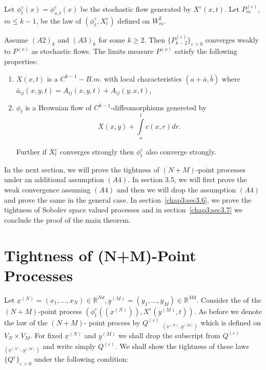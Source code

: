   Let $\phi^\varepsilon_t(x)= \phi^\varepsilon_{o,t}(x)$ be the
  stochastic flow generated by $X^\varepsilon(x,t)$. Let
  $P^{(\varepsilon)}_m$, $m \le k-1$, be the law of
  $(\phi^\varepsilon_t,  X^\varepsilon_t)$ defined on $W^2_m$. 
  

\begin{theorem}\label{c3:thm3.3.1}%
  Assume $(A2)_k$ and $(A3)_k$ for some $k \ge 2$. Then
  $\{P^{(\varepsilon)}_{k-2}\}_{\varepsilon > 0}$ converges weakly
  to $P^{(o)}$ as stochastic flows. The limits measure $P^{(o)}$ satisfy
  the following properties: 
  \begin{enumerate}[\rm (a)]
  \item $X (x,t)$ is a $C^{k-1}-B.m$. with local characteristics
    $(a+\bar{a}, \bar{b})$ where $\bar{a}_{ij}(x,y,t)= A_{ij}(x,y,t)
    + A_{ij}(y,x,t)$, 

  \item\pageoriginale $\phi_t$ is a Brownian flow of $C^{k-1}$-diffeomorphisms
    genereted by 
    $$X(x,y) + \int\limits_{o}^t c(x,r) dr.$$  
    
    Further if $X^\varepsilon _t$ converges strongly then
    $\phi^\varepsilon_t$ also converge strongly. 
  \end{enumerate}
\end{theorem}  

  In the next section, we will prove the tightness of $(N+M)$-point
  processes under an additional assumption $(A4)$. In section  3.5,
  we will first  prove the weak convergence assuming $(A4)$ and then
  we will drop the assumption  $(A4)$ and prove the same in the general
  case. In section~\ref{chap3:sec3.6},  we prove the tightness of Sobolev space
  valued processes and in section~\ref{chap3:sec3.7} we conclude the proof of the
  main theorem. 
  
\section{Tightness of (N+M)-Point Processes}\label{chap3:sec3.4}%
  
  Let $\underline{x}^{(N)}=  (x_1, \ldots,  x_N) \in
  \mathbb{R}^{Nd}, \underline{y}^{(M)}=  (y_1, \ldots, y_{M})
  \in \mathbb{R}^{Md}$. Consider the of the $(N+M)$-point
  process $(\phi^{\varepsilon}_{t} (( \underbar{x}^{(N)})),
  X^{\varepsilon}(\underbar{y}^{(M)}, t))$. As before we denote the
  law of the $(N+M)$- point process by $Q^{(\varepsilon)}$ $_{(
    \underline{x}^{(N)}, \underline{y}^{(M)})}$ which is defined on
  $V_N \times  V_M$. For fixed $\underline{x}^{(N)}$ and
  $\underline{y}^{(M)}$ we shall drop the subscript from
  $Q^{(\varepsilon)}$ $_{( \underline{x}^{(N)}, \underline{y}^{(M)})}$
  and write simply $Q^{(\varepsilon)}$. We shall  show the tightness
  of these laws $\{Q^{\varepsilon}\}_{\varepsilon > 0}$ under the
  following condition: 
  
